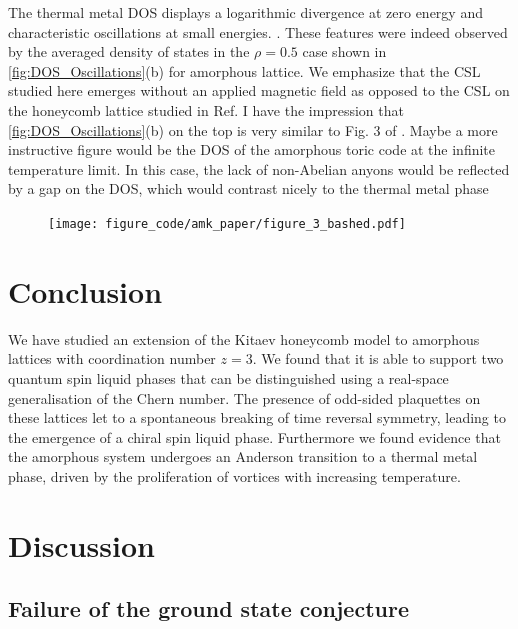 The thermal metal DOS displays a logarithmic divergence at zero energy
and characteristic oscillations at small energies.
\autocite{bocquet_disordered_2000,selfThermallyInducedMetallic2019}.
These features were indeed observed by the averaged density of states in
the \(\rho = 0.5\) case shown in
\protect\hyperlink{fig:DOS_Oscillations}{{[}fig:DOS\_Oscillations{]}}(b)
for amorphous lattice. We emphasize that the CSL studied here emerges
without an applied magnetic field as opposed to the CSL on the honeycomb
lattice studied in Ref. \autocite{selfThermallyInducedMetallic2019} I
have the impression that
\protect\hyperlink{fig:DOS_Oscillations}{{[}fig:DOS\_Oscillations{]}}(b)
on the top is very similar to Fig. 3 of
\autocite{selfThermallyInducedMetallic2019}. Maybe a more instructive
figure would be the DOS of the amorphous toric code at the infinite
temperature limit. In this case, the lack of non-Abelian anyons would be
reflected by a gap on the DOS, which would contrast nicely to the
thermal metal phase

\begin{figure}
\hypertarget{fig:figure_3_bashed}{%
\centering
\texttt{[image: figure\_code/amk\_paper/figure\_3\_bashed.pdf]}
\caption{}\label{fig:figure_3_bashed}
}
\end{figure}

\hypertarget{conclusion}{%
\section{Conclusion}\label{conclusion}}

We have studied an extension of the Kitaev honeycomb model to amorphous
lattices with coordination number \(z= 3\). We found that it is able to
support two quantum spin liquid phases that can be distinguished using a
real-space generalisation of the Chern number. The presence of odd-sided
plaquettes on these lattices let to a spontaneous breaking of time
reversal symmetry, leading to the emergence of a chiral spin liquid
phase. Furthermore we found evidence that the amorphous system undergoes
an Anderson transition to a thermal metal phase, driven by the
proliferation of vortices with increasing temperature.

\hypertarget{discussion}{%
\section{Discussion}\label{discussion}}

\hypertarget{failure-of-the-ground-state-conjecture}{%
\subsection{Failure of the ground state
conjecture}\label{failure-of-the-ground-state-conjecture}}

